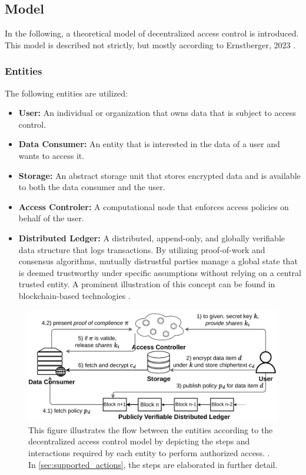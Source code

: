 \documentclass[conference]{IEEEtran}
\begin{document}
\subsection{Model}
In the following, a theoretical model of decentralized access control is introduced.
This model is described not strictly, but mostly according to Ernstberger, 2023 \cite{ernstberger_sok_2023}.

\subsubsection{Entities}
The following entities are utilized:

\begin{itemize}
  \item \textbf{User:} An individual or organization that owns data that is subject to access control.
  \item \textbf{Data Consumer:} An entity that is interested in the data of a user and wants to access it.
  \item \textbf{Storage:} An abstract storage unit that stores encrypted data and is available to both the data consumer and the user.
  \item \textbf{Access Controler:} A computational node that enforces access policies on behalf of the user.
  \item \textbf{Distributed Ledger:} A distributed, append-only, and globally verifiable data structure that logs transactions.
  By utilizing proof-of-work and consensus algorithms, mutually distrustful parties manage a global state that is deemed trustworthy under specific assumptions without relying on a central trusted entity.
  A prominent illustration of this concept can be found in blockchain-based technologies \cite{zheng_overview_2017}.
\end{itemize}

\begin{figure}[htbp]
  \centering
  \includegraphics[width=\linewidth]{figures/decentralized_access_control.pdf}
  \caption{
    This figure illustrates the flow between the entities according to the decentralized access control model by depicting the steps and interactions required by each entity to perform authorized access. \cite{ernstberger_sok_2023}.
    In \autoref{sec:supported_actions}, the steps are elaborated in further detail.
  }
  \label{fig:decentralized_access_control}
\end{figure}
\end{document}

